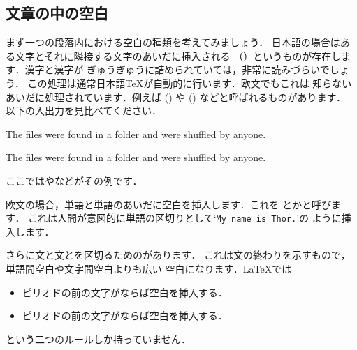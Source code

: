 {\subsection{文章の中の空白}
%
%
まず一つの段落内における空白の種類を考えてみましょう．
日本語の場合はある文字とそれに隣接する文字のあいだに挿入される
（）というものが存在します．漢字と漢字が
ぎゅうぎゅうに詰められていては，非常に読みづらいでしょう．
この処理は通常日本語{\TeX}が自動的に行います．欧文でもこれは
知らないあいだに処理されています．例えば () や
 () などと呼ばれるものがあります．
以下の入出力を見比べてください．
\begin{InOut}
The files were found in a folder 
and were shuffled by anyone.\par
The f{}iles were found in a folder 
and were shuf{}f{}led by anyone.
\end{InOut}
ここではやなどがその例です．


%
欧文の場合，単語と単語のあいだに空白を挿入します．これを
とかと呼びます．
これは人間が意図的に単語の区切りとして`\verb*|My name is Thor.|'の
ように挿入します．

%
さらに文と文とを区切るためのがあります．
これは文の終わりを示すもので，単語間空白や文字間空白よりも広い
空白になります．{\LaTeX}では
\begin{itemize}
 \item ピリオドの前の文字がならば空白を挿入する．
 \item ピリオドの前の文字がならば空白を挿入する．
\end{itemize}
という二つのルールしか持っていません．

}
